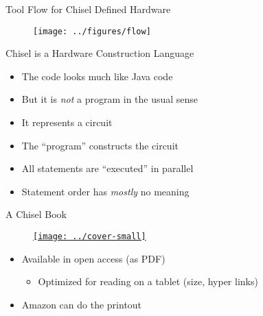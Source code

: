 \begin{frame}[fragile]{Tool Flow for Chisel Defined Hardware}
\begin{figure}
    \centering
    \texttt{[image: ../figures/flow]}
\end{figure}
\end{frame}

\begin{frame}[fragile]{Chisel is a Hardware Construction Language}
\begin{itemize}
\item The code looks much like Java code
\item But it is \emph{not} a program in the usual sense
\item It represents a circuit
\item The ``program'' constructs the circuit
\item All statements are ``executed'' in parallel
\item Statement order has \emph{mostly} no meaning
\end{itemize}
\end{frame}

\begin{frame}[fragile]{A Chisel Book}
\begin{figure}
    \centering
    \href{https://github.com/schoeberl/chisel-book}{\texttt{[image: ../cover-small]}}
\end{figure}

\begin{itemize}
\item Available in open access (as PDF)
\begin{itemize}
\item Optimized for reading on a tablet (size, hyper links)
\end{itemize}
\item Amazon can do the printout
\end{itemize}
\end{frame}





